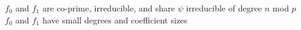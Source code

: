 \documentclass[preview]{standalone}
\begin{document}
$f_0$ and $f_1$ are co-prime, irreducible, and share $\psi$ irreducible of degree $n$ mod $p$\\$f_0$ and $f_1$ have small degrees and coefficient sizes\\
\end{document}
